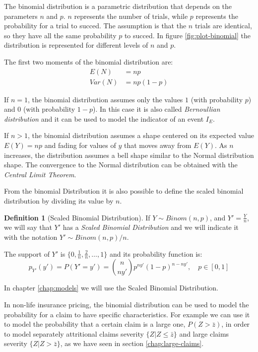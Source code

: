 \documentclass[a4paper, twoside, openright, 12pt]{report}
\theoremstyle{definition}
\newtheorem{definition}{Definition}[chapter]
\theoremstyle{definition}
\theoremstyle{definition}
\theoremstyle{remark}
\begin{document}
The binomial distribution is a parametric distribution that depends on the parameters \(n\) and \(p\). \(n\) represents the number of trials, while \(p\) represents the probability for a trial to succed. The assumption is that the \(n\) trials are identical, so they have all the same probability \(p\) to succed. In figure \ref{fig:plot-binomial} the distribution is represented for different levels of \(n\) and \(p\).

The first two moments of the binomial distribution are:
\begin{align*}
E(N)   & = np \\
Var(N) & = np(1-p)
\end{align*}

If \(n = 1\), the binomial distribution assumes only the values \(1\) (with probability \(p\)) and \(0\) (with probability \(1-p\)). In this case it is also called \emph{Bernoullian distribution} and it can be used to model the indicator of an event \(I_E\).

If \(n>1\), the binomial distribution assumes a shape centered on its expected value \(E(Y)=np\) and fading for values of \(y\) that moves away from \(E(Y)\). As \(n\) increases, the distribution assumes a bell shape similar to the Normal distribution shape. The convergence to the Normal distribution can be obtained with the \emph{Central Limit Theorem}.

From the binomial Distribution it is also possible to define the scaled binomial distribution by dividing its value by \(n\).

\begin{definition}[Scaled Binomial Distribution]
\label{def:def-scaled-binomial} \iffalse (Scaled Binomial Distribution) \fi{} If \(Y\sim Binom(n, p)\), and \(Y' = \frac{Y}{n}\), we will say that \(Y'\) has a \textit{Scaled Binomial Distribution} and we will indicate it with the notation \(Y' \sim Binom(n, p)/n\).

The support of \(Y'\) is \(\{0, \frac{1}{n}, \frac{2}{n}, \dots, 1 \}\) and its probability function is:
\[
p_{Y'}(y') = P\left( Y' = y' \right) = \binom{n}{ny'} p^{ny'} (1-p)^{n-ny'}, \quad p \in [0, 1]
\]
\end{definition}

In chapter \ref{chap:models} we will use the Scaled Binomial Distribution.

In non-life insurance pricing, the binomial distribution can be used to model the probability for a claim to have specific characteristics. For example we can use it to model the probability that a certain claim is a large one, \(P(Z>\bar{z})\), in order to model separately attritional claims severity \(\{Z|Z\le\bar{z}\}\) and large claims severity \(\{Z|Z>\bar{z}\}\), as we have seen in section \ref{chap:large-claims}.
\end{document}
